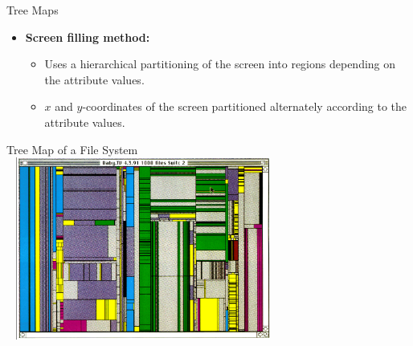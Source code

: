 \begin{frame}{Tree Maps}
  \centering
  \begin{itemize}
  \item \textbf{Screen filling method:}
    \begin{itemize}
    \item Uses a hierarchical partitioning of the screen into regions depending on the attribute values.
    \item $x$ and $y$-coordinates of the screen partitioned alternately according to the attribute values.
    \end{itemize}
  \end{itemize}
\end{frame}

\begin{frame}{Tree Map of a File System}
  \centering
  \vspace{0.5cm}
  \includegraphics[width=9cm, height=6cm]{img/treemap_filesystem.png}
\end{frame}

